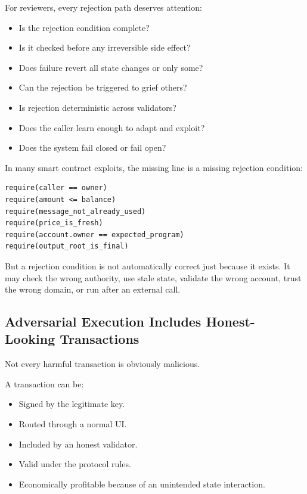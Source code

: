 For reviewers, every rejection path deserves attention:

\begin{itemize}
\tightlist
\item
  Is the rejection condition complete?
\item
  Is it checked before any irreversible side effect?
\item
  Does failure revert all state changes or only some?
\item
  Can the rejection be triggered to grief others?
\item
  Is rejection deterministic across validators?
\item
  Does the caller learn enough to adapt and exploit?
\item
  Does the system fail closed or fail open?
\end{itemize}

In many smart contract exploits, the missing line is a missing rejection
condition:

\begin{lstlisting}
require(caller == owner)
require(amount <= balance)
require(message_not_already_used)
require(price_is_fresh)
require(account.owner == expected_program)
require(output_root_is_final)
\end{lstlisting}

But a rejection condition is not automatically correct just because it
exists. It may check the wrong authority, use stale state, validate the
wrong account, trust the wrong domain, or run after an external call.

\subsection{Adversarial Execution Includes Honest-Looking Transactions}

Not every harmful transaction is obviously malicious.

A transaction can be:

\begin{itemize}
\tightlist
\item
  Signed by the legitimate key.
\item
  Routed through a normal UI.
\item
  Included by an honest validator.
\item
  Valid under the protocol rules.
\item
  Economically profitable because of an unintended state interaction.
\end{itemize}

